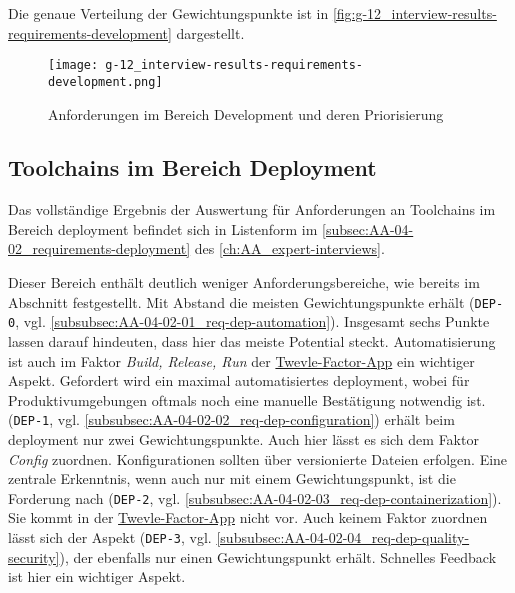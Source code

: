 Die genaue Verteilung der Gewichtungspunkte ist in \autoref{fig:g-12_interview-results-requirements-development} dargestellt.

\begin{figure}[h]
    \centering
    \texttt{[image: g-12\_interview-results-requirements-development.png]}
    \caption{Anforderungen im Bereich Development und deren Priorisierung}
    \label{fig:g-12_interview-results-requirements-development}
\end{figure}

\subsection{Toolchains im Bereich Deployment}
\label{subsec:04-02-03_toolchains-in-deployment}

Das vollständige Ergebnis der Auswertung für Anforderungen an Toolchains im Bereich \Gls{deployment} befindet sich in Listenform im \autoref{subsec:AA-04-02_requirements-deployment} des \autoref{ch:AA_expert-interviews}.

Dieser Bereich enthält deutlich weniger Anforderungsbereiche, wie bereits im Abschnitt  festgestellt. Mit Abstand die meisten Gewichtungspunkte erhält \textbf{} (\texttt{DEP-0}, vgl. \autoref{subsubsec:AA-04-02-01_req-dep-automation}). Insgesamt sechs Punkte lassen darauf hindeuten, dass hier das meiste Potential steckt. Automatisierung ist auch im Faktor \textit{Build, Release, Run} der \hyperref[sec:03-05_basic-idea-of-twelve-factor-app]{Twevle-Factor-App} ein wichtiger Aspekt. Gefordert wird ein maximal automatisiertes \Gls{deployment}, wobei für Produktivumgebungen oftmals noch eine manuelle Bestätigung notwendig ist. \textbf{} (\texttt{DEP-1}, vgl. \autoref{subsubsec:AA-04-02-02_req-dep-configuration}) erhält beim \Gls{deployment} nur zwei Gewichtungspunkte. Auch hier lässt es sich dem Faktor \textit{Config} zuordnen. Konfigurationen sollten über versionierte Dateien erfolgen. Eine zentrale Erkenntnis, wenn auch nur mit einem Gewichtungspunkt, ist die Forderung nach \textbf{} (\texttt{DEP-2}, vgl. \autoref{subsubsec:AA-04-02-03_req-dep-containerization}). Sie kommt in der \hyperref[sec:03-05_basic-idea-of-twelve-factor-app]{Twevle-Factor-App} nicht vor. Auch keinem Faktor zuordnen lässt sich der Aspekt \textbf{} (\texttt{DEP-3}, vgl. \autoref{subsubsec:AA-04-02-04_req-dep-quality-security}), der ebenfalls nur einen Gewichtungspunkt erhält. Schnelles Feedback ist hier ein wichtiger Aspekt.

